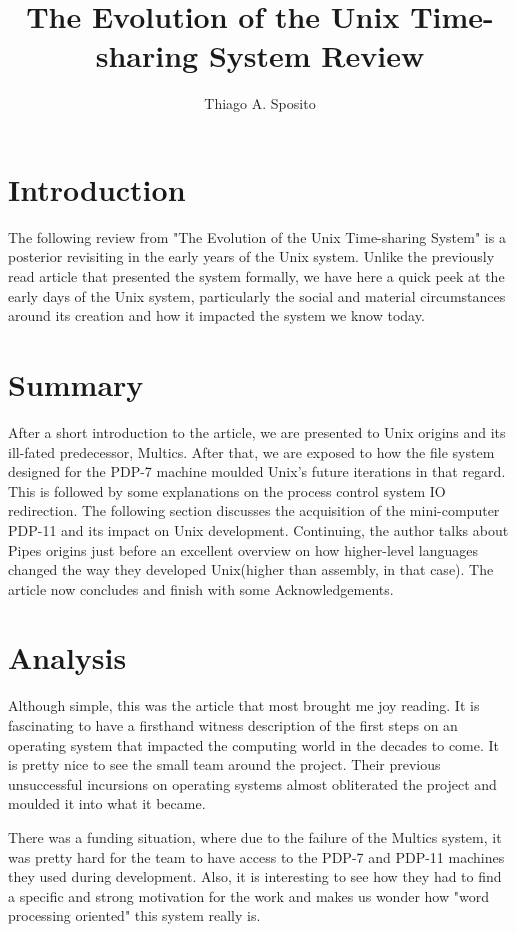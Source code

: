 \documentclass[12pt]{article}
\title{The Evolution of the Unix Time-sharing System Review}
\author{Thiago A. Sposito\inst{1} }
\begin{document}
 

\maketitle


\section{Introduction}
The following review from "The Evolution of the Unix Time-sharing System"\cite{ritchie1979evolution} is a posterior revisiting in the early years of the Unix system. Unlike the previously read article that presented the system formally, we have here a quick peek at the early days of the Unix system, particularly the social and material circumstances around its creation and how it impacted the system we know today.

\section{Summary}
After a short introduction to the article, we are presented to Unix origins and its ill-fated predecessor, Multics. After that, we are exposed to how the file system designed for the PDP-7 machine moulded Unix's future iterations in that regard. This is followed by some explanations on the process control system IO redirection. The following section discusses the acquisition of the mini-computer PDP-11 and its impact on Unix development. Continuing, the author talks about Pipes origins just before an excellent overview on how higher-level languages changed the way they developed Unix(higher than assembly, in that case). The article now concludes and finish with some Acknowledgements.

\section{Analysis}
Although simple, this was the article that most brought me joy reading. It is fascinating to have a firsthand witness description of the first steps on an operating system that impacted the computing world in the decades to come. It is pretty nice to see the small team around the project. Their previous unsuccessful incursions on operating systems almost obliterated the project and moulded it into what it became. 

There was a funding situation, where due to the failure of the Multics system, it was pretty hard for the team to have access to the PDP-7 and PDP-11 machines they used during development. Also, it is interesting to see how they had to find a specific and strong motivation for the work and makes us wonder how "word processing oriented" this system really is.
\end{document}
